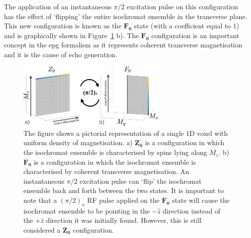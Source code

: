 \hfill

The application of an instantaneous $\pi/2$ excitation pulse on this configuration has the effect of `flipping' the entire isochromat ensemble in the transverse plane.
This new configuration is known as the $\bm{F_0}$ state \cite{Weigel2015} \cite{Scheffler1999} \cite{Hennig1991} (with a coefficient equal to $1$) and is graphically shown in Figure~\ref{fig:Z0F0states} b).
The $\bm{F_0}$ configuration is an important concept in the \ac{epg} formalism as it represents coherent transverse magnetisation and it is the cause of echo generation.

% 
% 

\begin{figure}[ht]
    \centering
    \includegraphics[angle=0,width=0.65\textwidth, keepaspectratio]{images/mrf/Z0F0states}
    \caption{The figure shows a pictorial representation of a single 1D voxel with uniform density of magnetisation.
    a) $\bm{Z_0}$ is a configuration in which the isochromat ensemble is characterised by spins lying along $M_z$.
    b) $\bm{F_0}$ is a configuration in which the isochromat ensemble is characterised by coherent transverse magnetisation.
    An instantaneous $\pi/2$ excitation pulse can `flip' the isochromat ensemble back and forth between the two states.
    It is important to note that a $(\pi/2)_x$ RF pulse applied on the $\bm{F_0}$ state will cause the isochromat ensemble to be pointing in the $- \hat{z}$ direction instead of the $+ \hat{z}$ direction it was initially found.
    However, this is still considered a $\bm{Z_0}$ configuration.
    }
    \label{fig:Z0F0states}
\end{figure}


